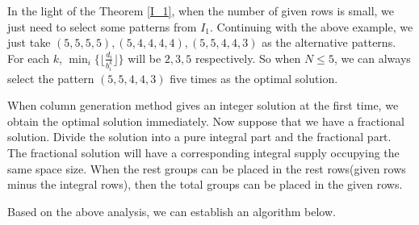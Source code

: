 In the light of the Theorem \ref{I_1}, when the number of given rows is small, we just need to select some patterns from $I_1$.
Continuing with the above example, we just take $(5,5,5,5), (5,4,4,4,4), (5,5,4,4,3)$ as the alternative patterns. For each $k$, $\min_{i} \{\lfloor \frac{d_i}{b_i^k}\rfloor\}$ will be $2,3,5$ respectively. So when $N \leq 5$, we can always select the pattern $(5,5,4,4,3)$ five times as the optimal solution.

When column generation method gives an integer solution at the first time, we obtain the optimal solution immediately. Now suppose that we have a fractional solution. Divide the solution into a pure integral part and the fractional part. The fractional solution will have a corresponding integral supply occupying the same space size. When the rest groups can be placed in the rest rows(given rows minus the integral rows), then the total groups can be placed in the given rows.

%

Based on the above analysis, we can establish an algorithm below.

